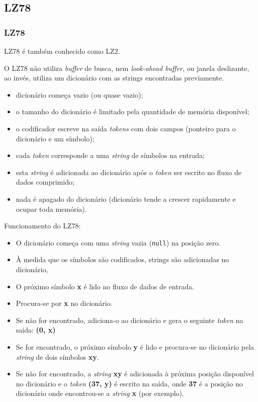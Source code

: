 \subsection{LZ78}
\begin{frame}[allowframebreaks] 
  \frametitle{LZ78}


  \vspace{1ex}
  LZ78 é também conhecido como LZ2.

  O LZ78 não utiliza \textit{buffer} de busca, nem \textit{look-ahead buffer}, ou janela deslizante,
  ao invés, utiliza um dicionário com as strings encontradas previamente.

  \begin{itemize}
  \item dicionário começa vazio (ou quase vazio);
  \item o tamanho do dicionário é limitado pela quantidade de memória disponível;
  \item o codificador escreve na saída \textit{tokens} com dois campos (ponteiro para o dicionário e um símbolo);
  \item cada \textit{token} corresponde a uma \textit{string} de símbolos na entrada;
  \item esta \textit{string} é adicionada ao dicionário após o \textit{token} ser escrito no fluxo de dados comprimido;
  \item nada é apagado do dicionário (dicionário tende a crescer rapidamente e ocupar toda memória).
  \end{itemize}

  \framebreak

  Funcionamento do LZ78:
  \begin{itemize}
  \item O dicionário começa com uma \textit{string} vazia (\texttt{null}) na posição zero.
  \item À medida que os símbolos são codificados, strings são adicionadas no dicionário,
  \item O próximo símbolo \textbf{x} é lido no fluxo de dados de entrada.
  \item Procura-se por \textbf{x} no dicionário.
  \item Se não for encontrado, adiciona-o ao dicionário e gera o seguinte \textit{token} na saída: \textbf{(0, x)}
  \item Se for encontrado, o próximo símbolo \textbf{y} é lido e procura-se no dicionário pela \textit{string} de
        dois símbolos \textbf{xy}.
  \item Se não for encontrado, a \textit{string} \textbf{xy} é adicionada à próxima posição disponível no dicionário e o 
        \textit{token} \textbf{(37, y)} é escrito na saída, onde \textbf{37} é a posição no dicionário onde encontrou-se
        a \textit{string} \textbf{x} (por exemplo).
  \end{itemize}  



\end{frame}

